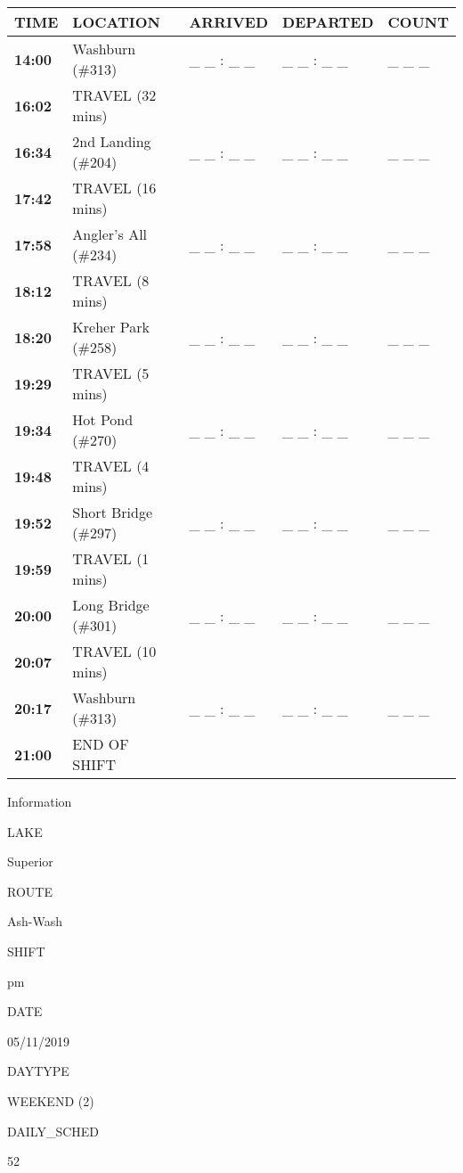 \documentclass[]{article}
\begin{document}
\begin{tabular}{>{\bfseries}lllll}
\toprule
\textbf{TIME} & \textbf{LOCATION} & \textbf{ARRIVED} & \textbf{DEPARTED} & \textbf{COUNT}\\
\midrule
14:00 & Washburn (\#313) & \_ \_ : \_ \_ & \_ \_ : \_ \_ & \_ \_ \_\\
16:02 & TRAVEL (32 mins) &  &  & \\
16:34 & 2nd Landing (\#204) & \_ \_ : \_ \_ & \_ \_ : \_ \_ & \_ \_ \_\\
17:42 & TRAVEL (16 mins) &  &  & \\
17:58 & Angler's All (\#234) & \_ \_ : \_ \_ & \_ \_ : \_ \_ & \_ \_ \_\\
18:12 & TRAVEL (8 mins) &  &  & \\
18:20 & Kreher Park (\#258) & \_ \_ : \_ \_ & \_ \_ : \_ \_ & \_ \_ \_\\
19:29 & TRAVEL (5 mins) &  &  & \\
19:34 & Hot Pond (\#270) & \_ \_ : \_ \_ & \_ \_ : \_ \_ & \_ \_ \_\\
19:48 & TRAVEL (4 mins) &  &  & \\
19:52 & Short Bridge (\#297) & \_ \_ : \_ \_ & \_ \_ : \_ \_ & \_ \_ \_\\
19:59 & TRAVEL (1 mins) &  &  & \\
20:00 & Long Bridge (\#301) & \_ \_ : \_ \_ & \_ \_ : \_ \_ & \_ \_ \_\\
20:07 & TRAVEL (10 mins) &  &  & \\
20:17 & Washburn (\#313) & \_ \_ : \_ \_ & \_ \_ : \_ \_ & \_ \_ \_\\
21:00 & END OF SHIFT &  &  & \\
\bottomrule
\end{tabular}\newpage

Information

LAKE

Superior

ROUTE

Ash-Wash

SHIFT

pm

DATE

05/11/2019

DAYTYPE

WEEKEND (2)

DAILY\_SCHED

52

\vspace{24pt}
\end{document}
